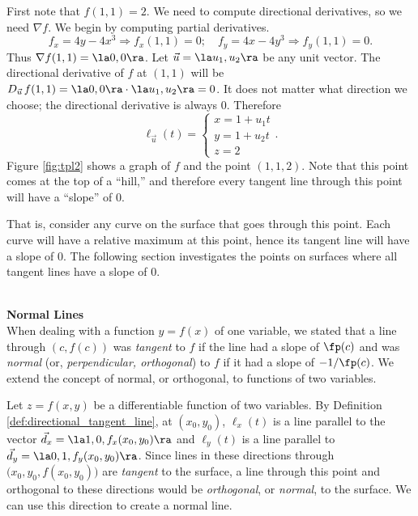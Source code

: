 {First note that $f(1,1) = 2$. We need to compute directional derivatives, so we need $\nabla f$. We begin by computing partial derivatives.
$$f_x = 4y-4x^3 \Rightarrow f_x(1,1) = 0;\quad f_y = 4x-4y^3\Rightarrow f_y(1,1) = 0.$$
Thus $\nabla f(1,1) = \la 0,0\ra$. Let $\vec u = \la u_1,u_2\ra$ be any unit vector. The directional derivative of $f$ at $(1,1)$ will be $D_{\vec u\,}f(1,1) = \la 0,0\ra\cdot \la u_1,u_2\ra = 0$. It does not matter what direction we choose; the directional derivative is always 0. Therefore
$$\ell_{\vec u}(t) = \left\{\begin{array}{l} x= 1 +u_1t\\ y = 1+ u_2 t\\ z= 2\end{array}\right..$$
Figure \ref{fig:tpl2} shows a graph of $f$ and the point $(1,1,2)$. Note that this point comes at the top of a ``hill,'' and therefore every tangent line through this point will have a ``slope'' of 0. 


That is, consider any curve on the surface that goes through this point. Each curve will have a relative maximum at this point, hence its tangent line will have a slope of 0. The following section investigates the points on surfaces where all tangent lines have a slope of 0.
}\\

\noindent\textbf{\large Normal Lines}\\

When dealing with a function $y=f(x)$ of one variable, we stated that a line through $(c,f(c))$ was \textit{tangent} to $f$ if the line had a slope of $\fp(c)$ and was \textit{normal} (or, \textit{perpendicular, orthogonal}) to $f$ if it had a slope of $-1/\fp(c)$. We extend the concept of normal, or orthogonal, to functions of two variables. 

Let $z=f(x,y)$ be a differentiable function of two variables. By Definition \ref{def:directional_tangent_line}, at $(x_0,y_0)$, $\ell_x(t)$ is a line parallel to the vector $\vec d_x=\la 1,0,f_x(x_0,y_0)\ra$ and $\ell_y(t)$ is a line parallel to $\vec d_y=\la 0,1,f_y(x_0,y_0)\ra$. Since lines in these directions through $\big(x_0,y_0,f(x_0,y_0)\big)$ are \textit{tangent} to the surface, a line through this point and orthogonal to these directions would be \textit{orthogonal}, or \textit{normal}, to the surface. We can use this direction to create a normal line.

